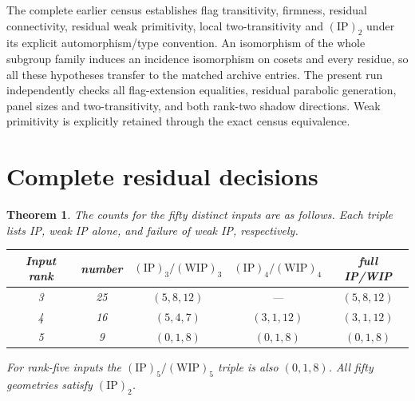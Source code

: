 \documentclass[11pt,a4paper]{article}
\newtheorem{theorem}{Theorem}
\begin{document}
The complete earlier census establishes flag transitivity, firmness,
residual connectivity, residual weak primitivity, local two-transitivity
and $(\mathrm{IP})_2$ under its explicit automorphism/type convention.
An isomorphism of the whole subgroup family induces an incidence
isomorphism on cosets and every residue, so all these hypotheses transfer
to the matched archive entries. The present run independently checks all
flag-extension equalities, residual parabolic generation, panel sizes and
two-transitivity, and both rank-two shadow directions. Weak primitivity
is explicitly retained through the exact census equivalence.

\section{Complete residual decisions}
\begin{theorem}
The counts for the fifty distinct inputs are as follows. Each triple
lists IP, weak IP alone, and failure of weak IP, respectively.
\begin{center}\begin{tabular}{ccccc}\toprule
Input rank&number&$(\mathrm{IP})_3/(\mathrm{WIP})_3$&
$(\mathrm{IP})_4/(\mathrm{WIP})_4$&full IP/WIP\\\midrule
3&25&$(5,8,12)$&---&$(5,8,12)$\\
4&16&$(5,4,7)$&$(3,1,12)$&$(3,1,12)$\\
5&9&$(0,1,8)$&$(0,1,8)$&$(0,1,8)$\\\bottomrule
\end{tabular}\end{center}
For rank-five inputs the $(\mathrm{IP})_5/(\mathrm{WIP})_5$ triple is also
$(0,1,8)$. All fifty geometries satisfy $(\mathrm{IP})_2$.
\end{theorem}
\end{document}
